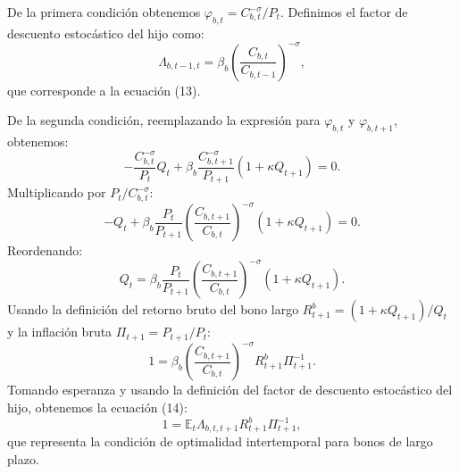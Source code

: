 \documentclass[../../entrega.tex]{subfiles}
\begin{document}
De la primera condición obtenemos $\varphi_{b,t} = C_{b,t}^{-\sigma}/P_t$.
Definimos el factor de descuento estocástico del hijo como:
\begin{equation}
    \Lambda_{b,t-1,t} = \beta_b\left(\frac{C_{b,t}}{C_{b,t-1}}\right)^{-\sigma},
\end{equation}
que corresponde a la ecuación (13).

De la segunda condición, reemplazando la expresión para $\varphi_{b,t}$ y $\varphi_{b,t+1}$, obtenemos:
\begin{equation*}
    -\frac{C_{b,t}^{-\sigma}}{P_t} Q_t + \beta_b \frac{C_{b,t+1}^{-\sigma}}{P_{t+1}}(1 + \kappa Q_{t+1}) = 0.
\end{equation*}
Multiplicando por $P_t/C_{b,t}^{-\sigma}$:
\begin{equation*}
    -Q_t + \beta_b \frac{P_t}{P_{t+1}} \left(\frac{C_{b,t+1}}{C_{b,t}}\right)^{-\sigma} (1 + \kappa Q_{t+1}) = 0.
\end{equation*}
Reordenando:
\begin{equation*}
    Q_t = \beta_b \frac{P_t}{P_{t+1}} \left(\frac{C_{b,t+1}}{C_{b,t}}\right)^{-\sigma} (1 + \kappa Q_{t+1}).
\end{equation*}
Usando la definición del retorno bruto del bono largo $R_{t+1}^b = (1 + \kappa Q_{t+1})/Q_t$ y la inflación bruta $\Pi_{t+1} = P_{t+1}/P_t$:
\begin{equation*}
    1 = \beta_b \left(\frac{C_{b,t+1}}{C_{b,t}}\right)^{-\sigma} R_{t+1}^b \Pi_{t+1}^{-1}.
\end{equation*}
Tomando esperanza y usando la definición del factor de descuento estocástico del hijo, obtenemos la ecuación (14):
\begin{equation}
    1 = \mathbb{E}_t \Lambda_{b,t,t+1} R_{t+1}^b \Pi_{t+1}^{-1},
\end{equation}
que representa la condición de optimalidad intertemporal para bonos de largo plazo.
\end{document}
